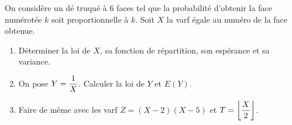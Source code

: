 \documentclass[a4paper, 11pt,reqno]{article}
\begin{document}
\begin{exercice}  \;
	On consid\`ere un d\'e truqu\'e \`a  6 faces tel que la probabilit\'e d'obtenir la face num\'erot\'ee $k$ soit proportionnelle \`a $k$. Soit $X$ la varf \'egale au num\'ero de la face obtenue.
	\begin{enumerate}
		\item D\'eterminer la loi de $X$, sa fonction de r\'epartition, son esp\'erance et sa variance.
		\item On pose $Y=\displaystyle\frac{1}{X}$. Calculer la loi de $Y$ et $E(Y)$.
		\item Faire de m\^eme avec les varf $Z=(X-2)(X-5)$ et $T=\left\lfloor \displaystyle\frac{X}{2} \right\rfloor$.
	\end{enumerate}
\end{exercice}
\end{document}
